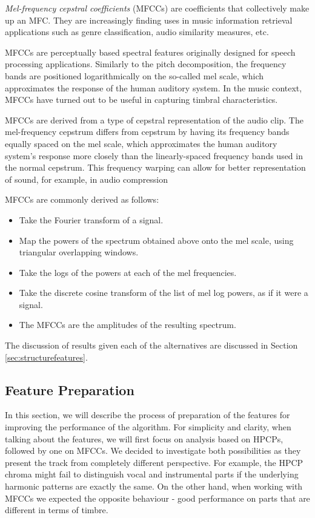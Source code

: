 \textit{Mel-frequency cepstral coefficients} (MFCCs) are coefficients that collectively make up an MFC. They are increasingly finding uses in music information retrieval applications such as genre classification, audio similarity measures, etc.

MFCCs are perceptually based spectral features originally designed for speech processing applications. Similarly to the pitch decomposition, the frequency bands are positioned logarithmically on the so-called mel scale, which approximates the response of the human auditory system. In the music context, MFCCs have turned out to be useful in capturing timbral characteristics.

MFCCs are derived from a type of cepstral representation of the audio clip. The mel-frequency cepstrum differs from cepstrum by having its frequency bands equally spaced on the mel scale, which approximates the human auditory system's response more closely than the linearly-spaced frequency bands used in the normal cepstrum. This frequency warping can allow for better representation of sound, for example, in audio compression \cite{mfcc}

MFCCs are commonly derived as follows:
\begin{itemize}
\item Take the Fourier transform of a signal.
\item Map the powers of the spectrum obtained above onto the mel scale, using triangular overlapping windows.
\item Take the logs of the powers at each of the mel frequencies.
\item Take the discrete cosine transform of the list of mel log powers, as if it were a signal.
\item The MFCCs are the amplitudes of the resulting spectrum.
\end{itemize}


The discussion of results given each of the alternatives are discussed in Section \ref{sec:structurefeatures}.

\vspace{10pt}

\subsection{Feature Preparation}

In this section, we will describe the process of preparation of the features for improving the performance of the algorithm. For simplicity and clarity, when talking about the features, we will first focus on analysis based on HPCPs, followed by one on MFCCs.
We decided to investigate both possibilities as they present the track from completely different perspective. For example, the HPCP chroma might fail to distinguish vocal and instrumental parts if the underlying harmonic patterns are exactly the same. On the other hand, when working with MFCCs we expected the opposite behaviour - good performance on parts that are different in terms of timbre.

